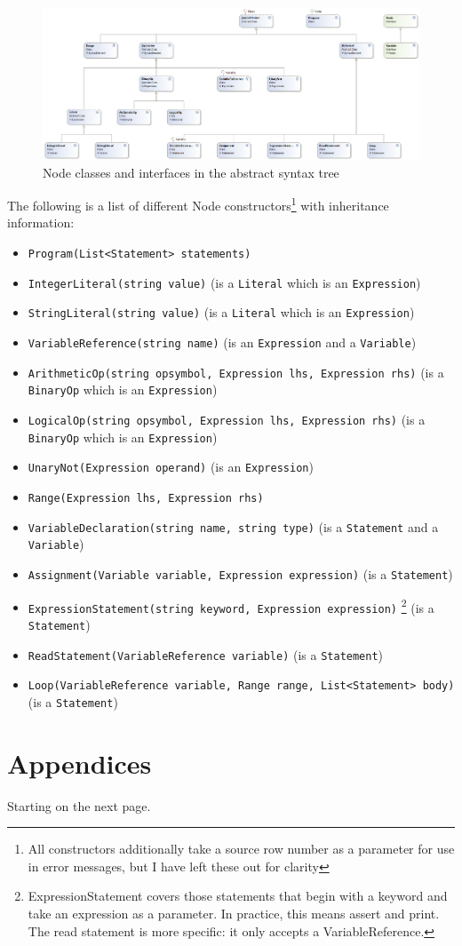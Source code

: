 \documentclass[a4paper,11pt]{article}
\begin{document}
\begin{figure}
\includegraphics[scale=0.5,angle=90]{ast.png}
\caption{Node classes and interfaces in the abstract syntax tree}
\label{fig:ast}
\end{figure}

The following is a list of different Node constructors\footnote{All constructors additionally take a source row number as a parameter for use in error messages, but I have left these out for clarity} with inheritance information:
\begin{itemize}
    \item \verb,Program(List<Statement> statements),
    \item \verb,IntegerLiteral(string value), (is a \verb,Literal, which is an \verb,Expression,)
    \item \verb,StringLiteral(string value), (is a \verb,Literal, which is an \verb,Expression,)
    \item \verb,VariableReference(string name), (is an \verb,Expression, and a \verb,Variable,)
    \item \verb/ArithmeticOp(string opsymbol, Expression lhs, Expression rhs)/ (is a \verb,BinaryOp, which is an \verb,Expression,)
    \item \verb/LogicalOp(string opsymbol, Expression lhs, Expression rhs)/ (is a \verb,BinaryOp, which is an \verb,Expression,)
    \item \verb/UnaryNot(Expression operand)/ (is an \verb,Expression,)
    \item \verb/Range(Expression lhs, Expression rhs)/
    \item \verb/VariableDeclaration(string name, string type)/ (is a \verb,Statement, and a \verb,Variable,)
    \item \verb/Assignment(Variable variable, Expression expression)/ (is a \verb,Statement,)
    \item \verb/ExpressionStatement(string keyword, Expression expression)/ \footnote{ExpressionStatement covers those statements that begin with a keyword and take an expression as a parameter. In practice, this means assert and print. The read statement is more specific: it only accepts a VariableReference.} (is a \verb,Statement,)
    \item \verb/ReadStatement(VariableReference variable)/ (is a \verb,Statement,)
    \item \verb/Loop(VariableReference variable, Range range, List<Statement> body)/ (is a \verb,Statement,)
\end{itemize}

\appendix
\section{Appendices}

Starting on the next page.




\end{document}

